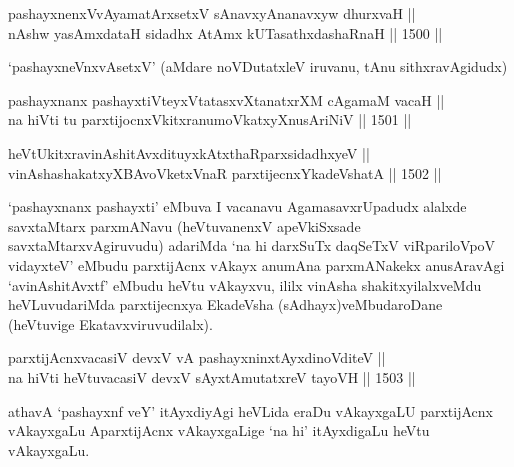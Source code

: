 \begin{shl}
pashayxnenxVvAyamatArx\s \s setxV sAnavxyAnanavxyw dhurxvaH || \\
nAshw yasAmxdataH sidadhx AtAmx kUTasathxdashaRnaH ||  1500 ||  
\end{shl}

\begin{artha}
`pashayxneVnxvAsetxV' (aMdare noVDutatxleV iruvanu, tAnu sithxravAgidudx) 
\end{artha}


\begin{shl}
pashayxnanx pashayxtiVteyxVtatasxvXtanatxrXM cA\s \s gamaM vacaH || \\
na hiVti tu parxtijocnxVkitxranumoVkatxyXnusAriNiV ||  1501 ||  
\end{shl}
				
\begin{shl}
heVtUkitxravinAshitAvxdituyxkAtxthaRparxsidadhxyeV || \\
vinAshashakatxyXBAvoVketxVnaR parxtijecnxYkadeVshatA ||  1502 ||  
\end{shl}

\begin{artha}
`pashayxnanx pashayxti' eMbuva I vacanavu AgamasavxrUpadudx alalxde savxtaMtarx parxmANavu (heVtuvanenxV apeVkiSxsade savxtaMtarxvAgiruvudu) adariMda `na hi darxSuTx daqSeTxV viRpariloVpoV vidayxteV' eMbudu parxtijAcnx vAkayx anumAna parxmANakekx anusAravAgi `avinAshitAvxtf' eMbudu heVtu vAkayxvu, ililx vinAsha shakitxyilalxveMdu heVLuvudariMda parxtijecnxya EkadeVsha (sAdhayx)veMbudaroDane (heVtuvige Ekatavxviruvudilalx).
\end{artha}


\begin{shl}
parxtijAcnxvacasiV devxV vA pashayxninxtAyxdinoVditeV || \\
na hiVti heVtuvacasiV devxV sAyxtAmutatxreV tayoVH ||  1503 ||  
\end{shl}

\begin{artha}
athavA `pashayxnf veY' itAyxdiyAgi heVLida eraDu vAkayxgaLU parxtijAcnx vAkayxgaLu AparxtijAcnx vAkayxgaLige `na hi' itAyxdigaLu heVtu vAkayxgaLu.
\end{artha}



